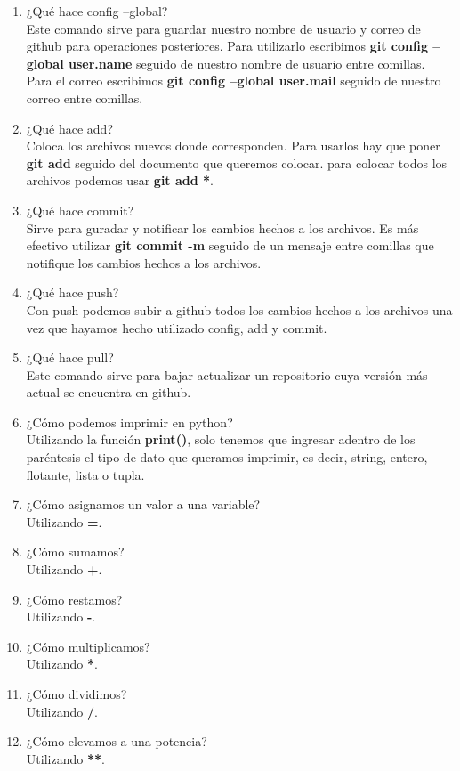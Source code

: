 \documentclass[letterpaper, 12pt, oneside]{article}%
\begin{document}
\begin{enumerate}
		\item ¿Qué hace config --global? \\ Este comando sirve para guardar nuestro nombre de usuario y correo de github para operaciones posteriores. Para utilizarlo escribimos \textbf{git config --global user.name} seguido de nuestro nombre de usuario entre comillas. Para el correo escribimos \textbf{git config --global user.mail} seguido de nuestro correo entre comillas.
		\item ¿Qué hace add? \\ Coloca los archivos nuevos donde corresponden. Para usarlos hay que poner \textbf{git add} seguido del documento que queremos colocar. para colocar todos los archivos podemos usar \textbf{git add *}.
		\item ¿Qué hace commit? \\ Sirve para guradar y notificar los cambios hechos a los archivos. Es más efectivo utilizar \textbf{git commit -m} seguido de un mensaje entre comillas que notifique los cambios hechos a los archivos.
		\item ¿Qué hace push? \\ Con push podemos subir a github todos los cambios hechos a los archivos una vez que hayamos hecho utilizado config, add y commit.
		\item ¿Qué hace pull? \\ Este comando sirve para bajar actualizar un repositorio cuya versión más actual se encuentra en github.
		\item ¿Cómo podemos imprimir en python? \\ Utilizando la función \textbf{print()}, solo tenemos que ingresar adentro de los paréntesis el tipo de dato que queramos imprimir, es decir, string, entero, flotante, lista o tupla.
		\item ¿Cómo asignamos un valor a una variable? \\ Utilizando \textbf{=}.
		\item ¿Cómo sumamos? \\ Utilizando \textbf{+}.
		\item ¿Cómo restamos? \\ Utilizando \textbf{-}.
		\item ¿Cómo multiplicamos? \\ Utilizando \textbf{*}.
		\item ¿Cómo dividimos? \\ Utilizando \textbf{/}.
		\item ¿Cómo elevamos a una potencia? \\ Utilizando \textbf{**}.

\end{enumerate}
\end{document}
